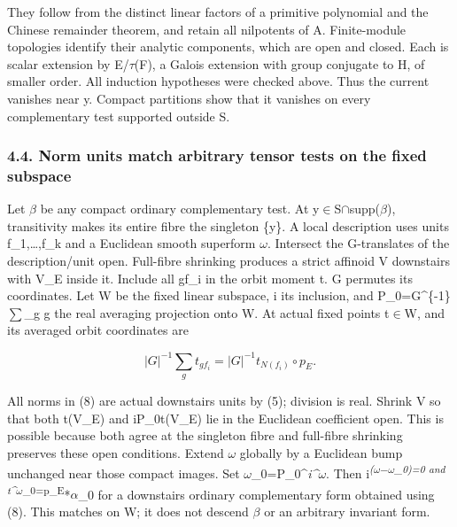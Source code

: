 \documentclass[
  10pt,
]{article}
\begin{document}
They follow from the distinct linear factors of a primitive polynomial
and the Chinese remainder theorem, and retain all nilpotents of A.
Finite-module topologies identify their analytic components, which are
open and closed. Each is scalar extension by E/\ensuremath{\tau}(F), a Galois extension
with group conjugate to H, of smaller order. All induction hypotheses
were checked above. Thus the current vanishes near y. Compact partitions
show that it vanishes on every complementary test supported outside S.

\subsubsection{4.4. Norm units match arbitrary tensor tests on the fixed
subspace}\label{norm-units-match-arbitrary-tensor-tests-on-the-fixed-subspace}

Let \ensuremath{\beta} be any compact ordinary complementary test. At y\ensuremath{\in}S\ensuremath{\cap}supp(\ensuremath{\beta}),
transitivity makes its entire fibre the singleton \{y\}. A local
description uses units f\_1,\ldots,f\_k and a Euclidean smooth superform
\ensuremath{\omega}. Intersect the G-translates of the description/unit open. Full-fibre
shrinking produces a strict affinoid V downstairs with V\_E inside it.
Include all gf\_i in the orbit moment t. G permutes its coordinates. Let
W be the fixed linear subspace, i its inclusion, and
P\_0=\textbar G\textbar\^{}\{-1\}\ensuremath{\sum}\_g g the real averaging projection
onto W. At actual fixed points t\ensuremath{\in}W, and its averaged orbit coordinates
are

\[
       |G|^{-1}\sum_g t_{gf_i}
          =|G|^{-1}t_{N(f_i)}\circ p_E.                     \tag{8}
\]

All norms in (8) are actual downstairs units by (5); division is real.
Shrink V so that both t(V\_E) and iP\_0t(V\_E) lie in the Euclidean
coefficient open. This is possible because both agree at the singleton
fibre and full-fibre shrinking preserves these open conditions. Extend \ensuremath{\omega}
globally by a Euclidean bump unchanged near those compact images. Set
\ensuremath{\omega}\_0=P\_0\^{}\emph{i\^{}}\ensuremath{\omega}. Then i\textsuperscript{\emph{(\ensuremath{\omega}\ensuremath{-}\ensuremath{\omega}\_0)=0 and
t\^{}}\ensuremath{\omega}\_0=p\_E}*\ensuremath{\alpha}\_0 for a downstairs ordinary complementary form
obtained using (8). This matches on W; it does not descend \ensuremath{\beta} or an
arbitrary invariant form.
\end{document}

